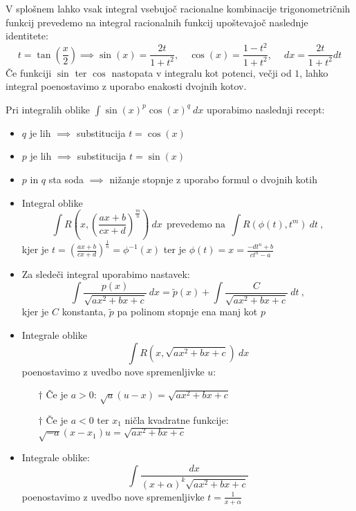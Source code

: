 \documentclass[12pt, a4paper, unicode]{article}
\begin{document}
\begin{naloga}
V splošnem lahko vsak integral vsebujoč racionalne kombinacije trigonometričnih funkcij prevedemo na integral racionalnih funkcij upoštevajoč naslednje identitete:
\[
t = \tan\left(\frac{x}{2}\right) \implies
\sin(x) = \frac{2t}{1+t^2}, \quad \cos(x) = \frac{1-t^2}{1+t^2}, \: \quad dx = \frac{2t}{1+t^2} dt
\]
Če funkciji $\sin$ ter $\cos$ nastopata v integralu kot potenci, večji od $1$, lahko integral poenostavimo z uporabo enakosti dvojnih kotov.

\bigskip

Pri integralih oblike $\int \sin(x)^p \cos(x)^q \: dx$ uporabimo naslednji recept:
\begin{itemize}
    \item $q$ je lih $\implies$ substitucija $t = \cos(x)$
    \item $p$ je lih $\implies$ substitucija $t = \sin(x)$
    \item $p$ in $q$ sta soda $\implies$ nižanje stopnje z uporabo formul o dvojnih kotih
\end{itemize}
\end{naloga}


\begin{naloga}
\begin{itemize}
    \item Integral oblike $$\int R(x, \left( \frac{ax+b}{cx+d} \right)^{\frac{m}{n}}) \: dx \: \: \text{prevedemo na} \: \: \int R(\phi(t), t^m) \: dt \:,$$ kjer je $t = \left( \frac{ax+b}{cx+d} \right)^{\frac{1}{n}} = \phi^{-1}(x)$ ter je $\phi(t) = x = \frac{-dt^n+b}{ct^n-a}$
    \bigskip
    \item Za sledeči integral uporabimo nastavek: $$\int \frac{p(x)}{\sqrt{ax^2+bx+c}} \: dx = \tilde{p}(x) + \int \frac{C}{\sqrt{ax^2+bx+c}}\: dt \:,$$ kjer je $C$ konstanta, $\tilde{p}$ pa polinom stopnje ena manj kot $p$
    \bigskip
    \item Integrale oblike $$\int R(x, \sqrt{ax^2+bx+c}) \: dx$$ poenostavimo z uvedbo nove spremenljivke $u$:
    \begin{itemize}
        \item[$\dagger$] Če je $a > 0$: $\sqrt{a}(u-x) = \sqrt{ax^2+bx+c}$
        \item[$\dagger$] Če je $a < 0$ ter $x_1$ ničla kvadratne funkcije: $\sqrt{-a}(x-x_1)u = \sqrt{ax^2+bx+c}$
    \end{itemize}
    \item Integrale oblike: $$\int \frac{dx}{(x+\alpha)^k \sqrt{ax^2+bx+c}}$$ poenostavimo z uvedbo nove spremenljivke $t = \frac{1}{x+\alpha}$
\end{itemize}
\end{naloga}
\end{document}
